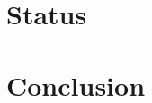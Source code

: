 \documentclass{webofc}
\begin{document}
\section{Status}

\section{Conclusion}






\end{document}
